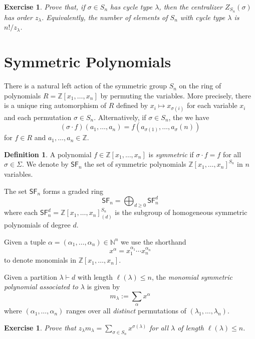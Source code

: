 \documentclass[12pt]{article}
\theoremstyle{plain}
\newtheorem{exercise}[theorem]{Exercise}
\theoremstyle{definition}
\newtheorem{definition}[theorem]{Definition}
\theoremstyle{remark}
\numberwithin{equation}{section}
\begin{document}
\begin{exercise}
Prove that, if $\sigma \in S_n$ has cycle type $\lambda$,
then the centralizer $Z_{S_n}(\sigma)$ has order $z_\lambda$.
Equivalently, the number of elements of $S_n$ with cycle type $\lambda$
is $n!/z_\lambda$.
\end{exercise}

\section{Symmetric Polynomials}

There is a natural left action of the symmetric group $S_n$ on the ring of
polynomials $R=\mathbb{Z}[x_1,\ldots,x_n]$ by permuting the variables.
More precisely, there is a unique ring automorphism of $R$ defined
by $x_i \mapsto x_{\sigma(i)}$ for each variable $x_i$ and each
permutation $\sigma \in S_n$.
Alternatively, if $\sigma \in S_n$, the we have
\[
(\sigma \cdot f)(a_1,\ldots,a_n) =
f\left(a_{\sigma(1)}, \ldots, a_{\sigma}(n)\right)
\]
for $f \in R$ and $a_1,\ldots,a_n \in \mathbb{Z}$.

\begin{definition}
A polynomial $f \in \mathbb{Z}[x_1,\ldots, x_n]$ is \emph{symmetric}
if $\sigma \cdot f = f$ for all $\sigma \in \Sigma$.
We denote by $\mathsf{SF}_n$ the set of symmetric polynomials
$\mathbb{Z}[x_1,\ldots,x_n]^{S_n}$ in $n$ variables.
\end{definition}

The set $\mathsf{SF}_n$ forms a graded ring
\[
\mathsf{SF}_n = \bigoplus_{d \ge 0} \mathsf{SF}_n^d
\]
where each $\mathsf{SF}_n^d = \mathbb{Z}[x_1,\ldots,x_n]_{(d)}^{S_n}$
is the subgroup of homogeneous symmetric polynomials of degree $d$.

Given a tuple $\alpha = (\alpha_1,\ldots,\alpha_n) \in \mathbb{N}^n$
we use the shorthand
\[
x^\alpha = x_1^{\alpha_1} \cdots x_n^{\alpha_n}
\]
to denote monomials in $\mathbb{Z}[x_1,\ldots,x_n]$.

Given a partition $\lambda \vdash d$ with length $\ell(\lambda) \le n$,
the \emph{monomial symmetric polynomial associated to $\lambda$}
is given by
\[
m_\lambda := \sum_{\alpha} x^\alpha
\]
where $(\alpha_1,\ldots,\alpha_n)$ ranges over all
\emph{distinct} permutations of $(\lambda_1,\ldots,\lambda_n)$.

\begin{exercise}
Prove that $\displaystyle z_\lambda m_\lambda = \sum_{\sigma \in S_n}
x^{\sigma(\lambda)}$ for all $\lambda$ of length $\ell(\lambda) \le n$.
\end{exercise}
\end{document}
